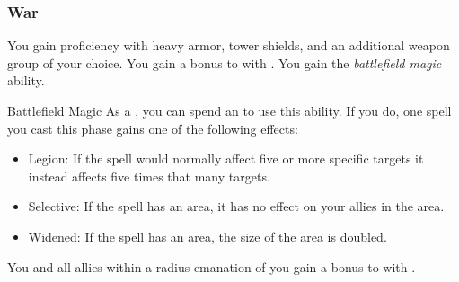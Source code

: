         \subsubsection{War}
             You gain proficiency with heavy armor, tower shields, and an additional weapon group of your choice.
             You gain a  bonus to  with .
             You gain the \textit{battlefield magic} ability.
            \begin{ability}{Battlefield Magic}
                As a , you can spend an  to use this ability.
                If you do, one spell you cast this phase gains one of the following effects:
                \begin{itemize}
                    \item Legion: If the spell would normally affect five or more specific targets it instead affects five times that many targets.
                    \item Selective: If the spell has an area, it has no effect on your allies in the area.
                    \item Widened: If the spell has an area, the size of the area is doubled.
                \end{itemize}
            \end{ability}
             You and all allies within a \arealarge radius emanation of you gain a  bonus to  with .

